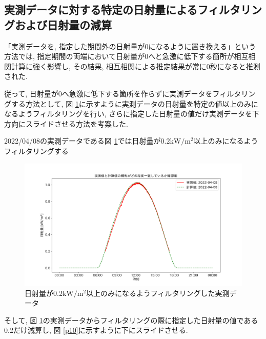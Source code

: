 \documentclass[a4j,12pt,]{jarticle}
\begin{document}
\subsection{実測データに対する特定の日射量によるフィルタリングおよび日射量の減算}
「実測データを, 指定した期間外の日射量が0になるように置き換える」という方法では, 指定期間の両端において日射量が0へと急激に低下する箇所が相互相関計算に強く影響し, その結果, 相互相関による推定結果が常に0秒になると推測された.

従って, 日射量が0へ急激に低下する箇所を作らずに実測データをフィルタリングする方法として, 図 \ref{p9}に示すように実測データの日射量を特定の値以上のみになるようフィルタリングを行い, さらに指定した日射量の値だけ実測データを下方向にスライドさせる方法を考案した.

2022/04/08の実測データである図 \ref{p9}では日射量が0.2$\mathrm{kW}/\mathrm{m}^2$以上のみになるようフィルタリングする

\begin{figure}[H]
  \begin{center}
    \includegraphics[width=160mm]{2022-04-08_mask_by_q_plot.png}
    \caption{日射量が0.2$\mathrm{kW}/\mathrm{m}^2$以上のみになるようフィルタリングした実測データ}
    \label{p9}
  \end{center}
\end{figure}

そして, 図 \ref{p9}の実測データからフィルタリングの際に指定した日射量の値である0.2だけ減算し, 図 \ref{p10}に示すように下にスライドさせる.
\end{document}
